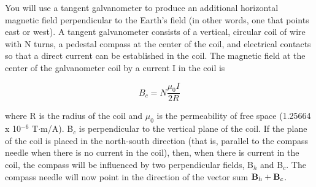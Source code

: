 %
%
%
%

You will use a tangent galvanometer to produce an additional horizontal
magnetic
field perpendicular to the Earth's field (in other words, one that
points east or west).
A tangent galvanometer consists of a vertical, circular coil of wire
with N turns, a pedestal compass at the center of the coil, and electrical
contacts so that a direct current can be established in the coil.
The magnetic field at the center of the galvanometer coil by a current
I in the coil is

\begin{displaymath} B_c = N\frac{\mu_0I}{2R} \end{displaymath}

where R is the radius of the coil and \( \mu _{0} \) is the permeability
of free space (1.25664 x 10\( ^{-6} \) T\( \cdot  \)m/A). B\( _{c} \)
is perpendicular to the vertical plane of the coil. If the plane of
the coil is placed in the north-south direction (that is, parallel
to the compass needle when there is no current in the coil), then,
when there is current in the coil, the compass will be influenced
by two perpendicular fields, B\( _{h} \) and B\( _{c} \). 
The compass needle will now point in the direction of the vector
sum ${\bf B}_h+{\bf B}_c$.  


